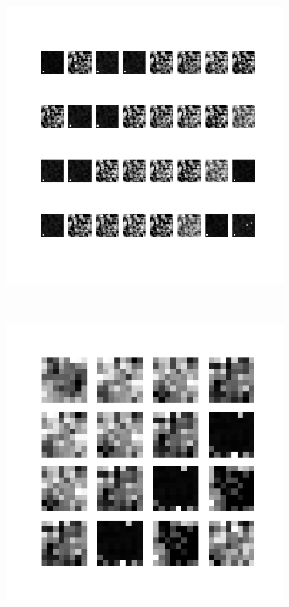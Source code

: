 \begin{figure}
\begin{subfigure}[b]{0.4\linewidth}
        \includegraphics[width=\linewidth]{images/cae_online_lstm/caelstm_section_cae_training_uniform_random_fill_10000_model_feature_maps_map_1_0_2.png}
    \end{subfigure}
    \\[-0.5cm]
    \begin{subfigure}[b]{0.4\linewidth}
        \includegraphics[width=\linewidth]{images/cae_online_lstm/caelstm_section_cae_training_uniform_random_fill_10000_model_feature_maps_map_1_0_1.png}

\end{subfigure}
\end{figure}
